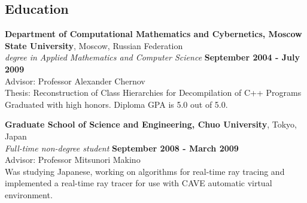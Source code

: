 \documentclass[margin,line]{CV}
\begin{document}
\begin{resume}
    
    
   
   
    \section{\mysidestyle Education}
    \textbf{Department of Computational Mathematics and Cybernetics, Moscow State University}, Moscow, Russian Federation \vspace{2mm}\\\vspace{1mm}%
    \textsl{ degree in Applied Mathematics and Computer Science} \hfill \textbf{September 2004 - July 2009}\vspace{1mm}\\
    Advisor: Professor Alexander Chernov \\
    Thesis: Reconstruction of Class Hierarchies for Decompilation of C++ Programs \\
    Graduated with high honors. Diploma GPA is 5.0 out of 5.0.

    \textbf{Graduate School of Science and Engineering, Chuo University}, Tokyo, Japan \vspace{2mm}\\\vspace{1mm}%
    \textsl{Full-time non-degree student} \hfill \textbf{September 2008 - March 2009}\vspace{1mm}\\
    Advisor: Professor Mitsunori Makino \\
    Was studying Japanese, working on algorithms for real-time ray tracing and implemented a real-time ray tracer for use with CAVE automatic virtual environment.


\end{resume}
\end{document}
